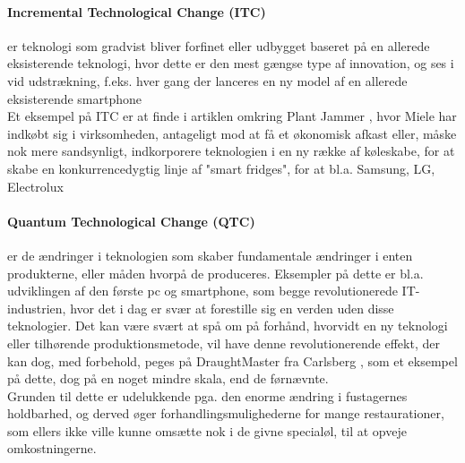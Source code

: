 \paragraph{Incremental Technological Change (ITC)} er teknologi som gradvist bliver forfinet eller udbygget baseret på en allerede
eksisterende teknologi, hvor dette er den mest gængse type af innovation, og ses i vid udstrækning, f.eks. hver gang der lanceres en ny model af en allerede eksisterende smartphone\\
Et eksempel på ITC er at finde i artiklen omkring Plant Jammer \cite[a.3]{eksamensopgave}, hvor Miele
har indkøbt sig i virksomheden, antageligt mod at få et økonomisk afkast eller, måske nok mere sandsynligt, indkorporere teknologien
i en ny række af køleskabe, for at skabe en konkurrencedygtig linje af "smart fridges", for at bl.a. Samsung, LG, Electrolux \cite{fridgemarketshare1, fridgemarketshare2}
\\\paragraph{Quantum Technological Change (QTC)} er de ændringer i teknologien som skaber fundamentale ændringer i enten produkterne, eller måden hvorpå de produceres.
Eksempler på dette er bl.a. udviklingen af den første pc og smartphone, som begge revolutionerede IT-industrien, hvor det i dag er svær at forestille sig en verden
uden disse teknologier. Det kan være svært at spå om på forhånd, hvorvidt en ny teknologi eller tilhørende produktionsmetode, vil have denne revolutionerende effekt, der kan dog, med forbehold,
peges på DraughtMaster fra Carlsberg \cite[a.2]{eksamensopgave}, som et eksempel på dette, dog på en noget mindre skala, end de førnævnte.\\
Grunden til dette er udelukkende pga. den enorme ændring i fustagernes holdbarhed, og derved øger forhandlingsmulighederne for mange restaurationer, som ellers ikke ville
kunne omsætte nok i de givne specialøl, til at opveje omkostningerne.
